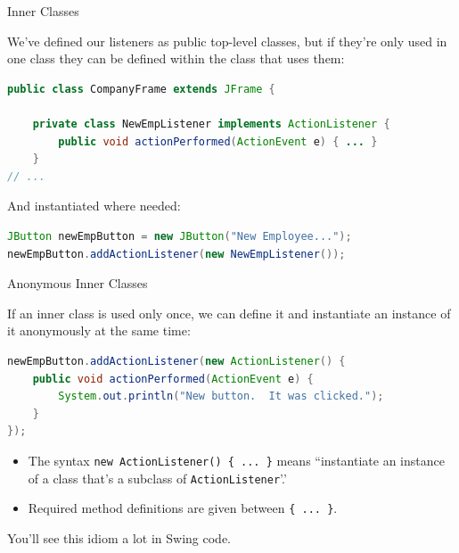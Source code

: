 \documentclass{beamer}
\begin{document}
\begin{frame}[fragile]{Inner Classes}


We've defined our listeners as public top-level classes, but if they're only used in one class they can be defined within the class that uses them:

\begin{lstlisting}[language=Java]
public class CompanyFrame extends JFrame {

    private class NewEmpListener implements ActionListener {
        public void actionPerformed(ActionEvent e) { ... }
    }
// ...
\end{lstlisting}

And instantiated where needed:

\begin{lstlisting}[language=Java]
JButton newEmpButton = new JButton("New Employee...");
newEmpButton.addActionListener(new NewEmpListener());
\end{lstlisting}


\end{frame}

\begin{frame}[fragile]{Anonymous Inner Classes}


If an inner class is used only once, we can define it and instantiate an instance of it anonymously at the same time:
\begin{lstlisting}[language=Java]
newEmpButton.addActionListener(new ActionListener() {
    public void actionPerformed(ActionEvent e) {
        System.out.println("New button.  It was clicked.");
    }
});
\end{lstlisting}

\begin{itemize}
\item The syntax {\tt new ActionListener() \{ ... \}} means ``instantiate an instance of a class that's a subclass of {\tt ActionListener}'.'
\item Required method definitions are given between {\tt \{ ... \}}.
\end{itemize}

You'll see this idiom a lot in Swing code.


\end{frame}
\end{document}
